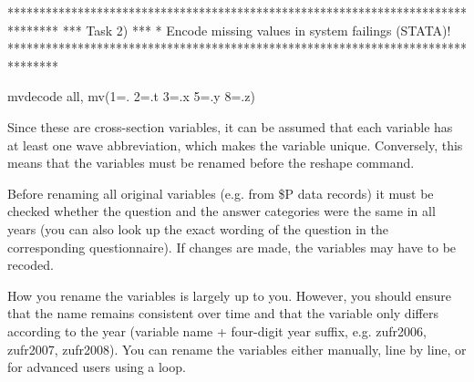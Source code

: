 \documentclass[letterpaper,10pt,openany,onesideH,english]{sphinxmanual}
\begin{document}
%
\begin{sphinxVerbatim}[commandchars=\\\{\},numbers=left,firstnumber=1,stepnumber=1]
********************************************************************************
*** Task 2) ***
* Encode missing values in system failings (STATA)!
********************************************************************************

	mvdecode \PYGZus{}all, mv(\PYGZhy{}1=. \PYGZbs{} \PYGZhy{}2=.t \PYGZbs{} \PYGZhy{}3=.x \PYGZbs{} \PYGZhy{}5=.y \PYGZbs{} \PYGZhy{}8=.z)
\end{sphinxVerbatim}


Since these are cross-section variables, it can be assumed that each variable has at least one wave abbreviation, which makes the variable unique. Conversely, this means that the variables must be renamed before the reshape command.

Before renaming all original variables (e.g. from \$P data records) it must be checked whether the question and the answer categories were the same in all years (you can also look up the exact wording of the question in the corresponding questionnaire). If changes are made, the variables may have to be recoded.

%
\begin{sphinxVerbatim}[commandchars=\\\{\},numbers=left,firstnumber=1,stepnumber=1]
       
	   
	  
	     
\end{sphinxVerbatim}

How you rename the variables is largely up to you. However, you should ensure that the name remains consistent over time and that the variable only differs according to the year (variable name + four-digit year suffix, e.g. zufr2006, zufr2007, zufr2008). You can rename the variables either manually, line by line, or for advanced users using a loop.
\end{document}
